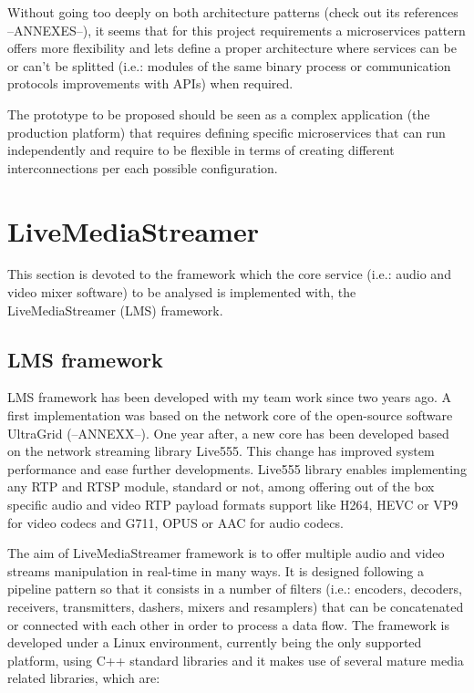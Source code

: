 Without going too deeply on both architecture patterns (check out its references --ANNEXES--), it seems that for this project requirements a microservices pattern offers more flexibility and lets define a proper architecture where services can be or can't be splitted (i.e.: modules of the same binary process or communication protocols improvements with APIs) when required. 

The prototype to be proposed should be seen as a complex application (the production platform) that requires defining specific microservices that can run independently and require to be flexible in terms of creating different interconnections per each possible configuration.
 
\section{LiveMediaStreamer}\label{SOA:LMS}

This section is devoted to the framework which the core service (i.e.: audio and video mixer software) to be analysed is implemented with, the LiveMediaStreamer (LMS) framework. 

\subsection{LMS framework}\label{SOA:LMSframework}

LMS framework has been developed with my team work since two years ago. A first implementation was based on the network core of the open-source software UltraGrid (--ANNEXX--). One year after, a new core has been developed based on the network streaming library Live555. This change has improved system performance and ease further developments. Live555 library enables implementing any RTP and RTSP module, standard or not, among offering out of the box specific audio and video RTP payload formats support like H264, HEVC or VP9 for video codecs and G711, OPUS or AAC for audio codecs.

The aim of LiveMediaStreamer framework is to offer multiple audio and video streams manipulation in real-time in many ways. It is designed following a pipeline pattern so that it consists in a number of filters (i.e.: encoders, decoders, receivers, transmitters, dashers, mixers and resamplers) that can be concatenated or connected with each other in order to process a data flow. The framework is developed under a Linux environment, currently being the only supported platform, using C++ standard libraries and it makes use of several mature media related libraries, which are: 

